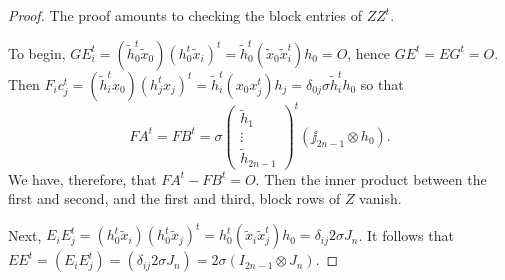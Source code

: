\documentclass[../../../main]{subfiles}
\begin{document}
 \begin{proof}
  The proof amounts to checking the block entries of $ZZ^t$. 
  
  To begin, $GE_i^t = (\tilde h_0^t \tilde x_0)(h_0^t \tilde x_i)^t = \tilde h_0^t (\tilde x_0 \tilde x_i^t) h_0 = O$, hence $GE^t = EG^t = O$. Then
   $F_ic_j^t = (\tilde h_i^t x_0)(h_j^tx_j)^t = \tilde h_i^t (x_0x_j^t) h_j = \delta_{0j}\sigma \tilde h_i^t h_0$ so that
   \[
   FA^t = FB^t = \sigma \begin{pmatrix} \tilde h_1 \\ \vdots \\ \tilde h_{2n-1} \end{pmatrix}^t (\jj_{2n-1} \otimes h_0).
   \]
  We have, therefore, that $FA^t - FB^t = O$. Then the inner product between the first and second, and the first and third, block rows of $Z$ vanish. 
  
  Next, $E_iE_j^t = (h_0^t \tilde x_i)(h_0^t \tilde x_j)^t = h_0^t(\tilde x_i \tilde x_j^t)h_0 = \delta_{ij}2\sigma J_n$. It follows that $EE^t=(E_iE_j^t)=(\delta_{ij}2\sigma J_n) = 2\sigma(I_{2n-1} \otimes J_n)$.
  

\end{proof}
\end{document}
